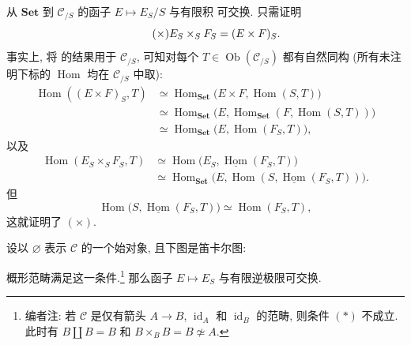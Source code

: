 从 \(\mathbf{Set}\) 到 \(\mathscr C_{/S}\) 的函子 \(E\mapsto E_S/S\) 与有限积
可交换. 只需证明
\begin{equation}
  \tag{\ensuremath{\times}}
  E_S\mathbin{\times_S}F_S=(E\times F)_S.
\end{equation}
事实上, 将  的结果用于 \(\mathscr C_{/S}\),
可知对每个 \(T\in\operatorname{Ob}(\mathscr C_{/S})\) 都有自然同构
(所有未注明下标的 \(\operatorname{Hom}\) 均在 \(\mathscr C_{/S}\) 中取):
\begin{align*}
  \operatorname{Hom}((E\times F)_S,T)
  &\simeq
    \operatorname{Hom}_{\mathbf{Set}}
      \bigl(E\times F,\operatorname{Hom}(S,T)\bigr)\\
  &\simeq
    \operatorname{Hom}_{\mathbf{Set}}
      \bigl(E,
        \operatorname{Hom}_{\mathbf{Set}}
          (F,\operatorname{Hom}(S,T))\bigr)\\
  &\simeq
    \operatorname{Hom}_{\mathbf{Set}}
      \bigl(E,\operatorname{Hom}(F_S,T)\bigr),
\end{align*}
以及
\begin{align*}
  \operatorname{Hom}(E_S\mathbin{\times_S}F_S,T)
  &\simeq
    \operatorname{Hom}
      \bigl(E_S,\underline{\operatorname{Hom}}(F_S,T)\bigr)\\
  &\simeq
    \operatorname{Hom}_{\mathbf{Set}}
      \bigl(E,
        \operatorname{Hom}
          (S,\underline{\operatorname{Hom}}(F_S,T))\bigr).
\end{align*}
但
\[
  \operatorname{Hom}
    \bigl(S,\underline{\operatorname{Hom}}(F_S,T)\bigr)
  \simeq \operatorname{Hom}(F_S,T),
\]
这就证明了 \((\times)\).

设以 \(\varnothing\) 表示 \(\mathscr C\) 的一个始对象, 且下图是笛卡尔图:

\begin{center}
  \makebox[0.62\textwidth][l]{%
    \textup{(*)}\hfill
    \hfill\phantom{\textup{(*)}}%
  }
\end{center}
概形范畴满足这一条件.\footnote{编者注: 若 \(\mathscr C\) 是仅有箭头
\(A\to B\), \(\operatorname{id}_A\) 和 \(\operatorname{id}_B\) 的范畴, 则条件
\((*)\) 不成立. 此时有 \(B\coprod B=B\) 和 \(B\times_BB=B\not\simeq A\).}
那么函子 \(E\mapsto E_S\) 与有限逆极限可交换.

